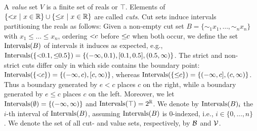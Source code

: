 %
A \emph{value} set $V$ is a finite set of reals or $\top$.
Elements of $\{ <\!\!{x} ~|~ x \in \mathbb{R} \}	\cup \{ \leq\!\!{x} ~|~ x \in \mathbb{R} \}$ are called \emph{cuts}. Cut sets induce intervals partitioning the reals as follows:
 Given a non-empty cut set $B =\{ \sim_1\!\!x_1, \ldots, \sim_n\!\! x_n \}$ with $x_1 \leq \ldots \leq x_n$, ordering $<\!\!{c}$ before $\leq\!\!{c}$ when both occur, we define the set $\text{Intervals}(B)$ of intervals it induces as expected, e.g., 
 $\text{Intervals}(\{<\!\!{0.1},\leq\!\!{0.5}\}) = \{(-\infty,0.1), [0.1,0.5], (0.5,\infty)\}$.
The strict and non-strict cuts differ only in which side contains the boundary point: $\text{Intervals}(\{<\!\!{c}\}) = \{(-\infty,c), [c,\infty)\}$, whereas $\text{Intervals}(\{\leq\!\!{c}\}) = \{(-\infty,c], (c,\infty)\}$. Thus a boundary generated by $e<c$ places $c$ on the right, while a boundary generated by $e\leq c$ places $c$ on the left.
%
%
Moreover, we let $\text{Intervals}(\emptyset) = \{(-\infty,\infty)\}$ and $\text{Intervals}(\top) = 2^{\mathbb{R}}$. We denote by $\text{Intervals}(B)_i$ the $i$-th interval of $\text{Intervals}(B)$, assuming $\text{Intervals}(B)$ is $0$-indexed, i.e., $i \in \{0,...,n\}$. We denote the set of all cut- and value sets, respectively, by $\mathcal{B}$ and $\mathcal{V}$. 
